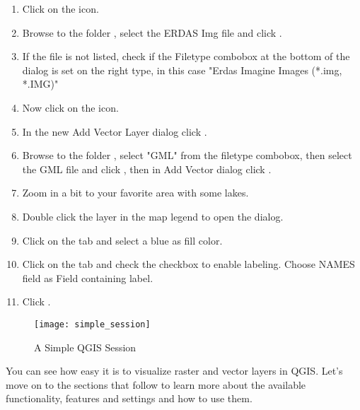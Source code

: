 
\begin{enumerate}
\item Click on the  icon.
\item Browse to the folder , select 
the ERDAS Img file  and click .
\item If the file is not listed, check if the Filetype combobox at the
bottom of the dialog is set on the right type, in this case "Erdas Imagine
Images (*.img, *.IMG)"
\item Now click on the  icon.
\item In the new Add Vector Layer dialog click .
\item Browse to the folder , select "GML"
from the filetype combobox, then select the GML file  
and click , then in Add Vector dialog click .
\item Zoom in a bit to your favorite area with some lakes.
\item Double click the  layer in the map legend to open the 
 dialog.
\item Click on the  tab and select a blue as fill color.
\item Click on the  tab and check the  
checkbox to enable labeling. Choose NAMES field as Field containing label.
\item Click .
\end{enumerate} 

\begin{figure}[ht]
   \begin{center}
   \caption{A Simple QGIS Session \nixcaption}\label{fig:simple_session}\smallskip
   \texttt{[image: simple\_session]}
\end{center}  
\end{figure}

You can see how easy it is to visualize raster and vector layers in 
QGIS. Let's move on to the sections that follow to learn more about the 
available functionality, features and settings and how to use them.
